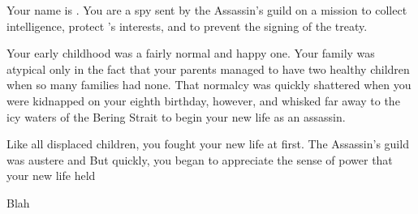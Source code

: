 \documentclass[char]{NeptuneBall}
\begin{document}
\name{\cSpy{}}

Your name is \cSpy{}. You are a spy sent by the Assassin's guild on a mission to collect intelligence, protect \pPacifica{}'s interests, and to prevent the signing of the treaty.

Your early childhood was a fairly normal and happy one. Your family was atypical only in the fact that your parents managed to have two healthy children when so many families had none. That normalcy was quickly shattered when you were kidnapped on your eighth birthday, however, and whisked far away to the icy waters of the Bering Strait to begin your new life as an assassin.

Like all displaced children, you fought your new life at first. The Assassin's guild was austere and But quickly, you began to appreciate the sense of power that your new life held

\begin{itemz}[Goals]
  \item Blah
\end{itemz}

\begin{contacts}
  \contact{}
\end{contacts}
\end{document}
